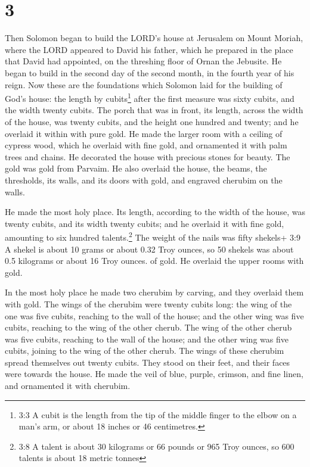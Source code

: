 \hypertarget{section-2}{%
\section{3}\label{section-2}}

 Then Solomon began to build the LORD's house at Jerusalem
on Mount Moriah, where the LORD appeared to David his father, which he
prepared in the place that David had appointed, on the threshing floor
of Ornan the Jebusite.  He began to build in the second day
of the second month, in the fourth year of his reign.  Now
these are the foundations which Solomon laid for the building of God's
house: the length by cubits\footnote{3:3 A cubit is the length from the
  tip of the middle finger to the elbow on a man's arm, or about 18
  inches or 46 centimetres.} after the first measure was sixty cubits,
and the width twenty cubits.  The porch that was in front,
its length, across the width of the house, was twenty cubits, and the
height one hundred and twenty; and he overlaid it within with pure gold.
 He made the larger room with a ceiling of cypress wood,
which he overlaid with fine gold, and ornamented it with palm trees and
chains.  He decorated the house with precious stones for
beauty. The gold was gold from Parvaim.  He also overlaid
the house, the beams, the thresholds, its walls, and its doors with
gold, and engraved cherubim on the walls.

 He made the most holy place. Its length, according to the
width of the house, was twenty cubits, and its width twenty cubits; and
he overlaid it with fine gold, amounting to six hundred
talents.\footnote{3:8 A talent is about 30 kilograms or 66 pounds or 965
  Troy ounces, so 600 talents is about 18 metric tonnes} 
The weight of the nails was fifty shekels+ 3:9 A shekel is about 10
grams or about 0.32 Troy ounces, so 50 shekels was about 0.5 kilograms
or about 16 Troy ounces. of gold. He overlaid the upper rooms with gold.

 In the most holy place he made two cherubim by carving,
and they overlaid them with gold.  The wings of the
cherubim were twenty cubits long: the wing of the one was five cubits,
reaching to the wall of the house; and the other wing was five cubits,
reaching to the wing of the other cherub.  The wing of the
other cherub was five cubits, reaching to the wall of the house; and the
other wing was five cubits, joining to the wing of the other cherub.
 The wings of these cherubim spread themselves out twenty
cubits. They stood on their feet, and their faces were towards the
house.  He made the veil of blue, purple, crimson, and fine
linen, and ornamented it with cherubim.

